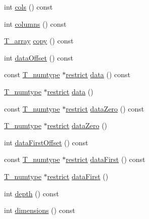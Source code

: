 \begin{DoxyCompactItemize}
\item 
int \hyperlink{classArray_a553797ddb83a9067e6bdcdeafe16207f}{cols} () const 
\item 
int \hyperlink{classArray_ae940de0329ca6515a808165d3407ee35}{columns} () const 
\item 
\hyperlink{classArray_a6a3d9b6a214107a10df219091801f1e0}{T\+\_\+array} \hyperlink{classArray_ac84c66511a5d1cc7922f748ce194f19a}{copy} () const 
\item 
int \hyperlink{classArray_a6787ff4e92e668cc1befd943ecfe9b48}{data\+Offset} () const 
\item 
const \hyperlink{classArray_ae72770f4a1d2f8b7193badafc320f008}{T\+\_\+numtype} $\ast$\hyperlink{compiler_8h_a080abdcb9c02438f1cd2bb707af25af8}{restrict} \hyperlink{classArray_a3a274253c2e3b391777f9e10542b8322}{data} () const 
\item 
\hyperlink{classArray_ae72770f4a1d2f8b7193badafc320f008}{T\+\_\+numtype} $\ast$\hyperlink{compiler_8h_a080abdcb9c02438f1cd2bb707af25af8}{restrict} \hyperlink{classArray_a5bface1d3609ecf211265bd7b23a881b}{data} ()
\item 
const \hyperlink{classArray_ae72770f4a1d2f8b7193badafc320f008}{T\+\_\+numtype} $\ast$\hyperlink{compiler_8h_a080abdcb9c02438f1cd2bb707af25af8}{restrict} \hyperlink{classArray_a04566dfbb67a5547cf85f398f681d589}{data\+Zero} () const 
\item 
\hyperlink{classArray_ae72770f4a1d2f8b7193badafc320f008}{T\+\_\+numtype} $\ast$\hyperlink{compiler_8h_a080abdcb9c02438f1cd2bb707af25af8}{restrict} \hyperlink{classArray_a9a31a58f9c9962663982b083540a673b}{data\+Zero} ()
\item 
int \hyperlink{classArray_a9de13425dad30fcfc9476fea118f3ab2}{data\+First\+Offset} () const 
\item 
const \hyperlink{classArray_ae72770f4a1d2f8b7193badafc320f008}{T\+\_\+numtype} $\ast$\hyperlink{compiler_8h_a080abdcb9c02438f1cd2bb707af25af8}{restrict} \hyperlink{classArray_a11659c9e06ad710292be467d337adc0f}{data\+First} () const 
\item 
\hyperlink{classArray_ae72770f4a1d2f8b7193badafc320f008}{T\+\_\+numtype} $\ast$\hyperlink{compiler_8h_a080abdcb9c02438f1cd2bb707af25af8}{restrict} \hyperlink{classArray_ab8997d7b06c92fa8cf8a6d5db6f84aaf}{data\+First} ()
\item 
int \hyperlink{classArray_aefb89a7b950cd164199ba6a95feb3389}{depth} () const 
\item 
int \hyperlink{classArray_a284bc99bd70755aff7fabf81105a7fe8}{dimensions} () const 
\item 

\end{DoxyCompactItemize}
